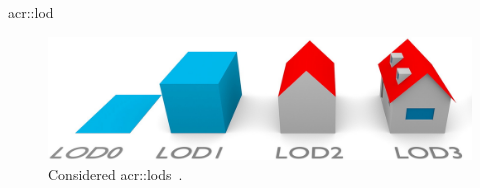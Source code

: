 \documentclass[12pt]{beamer}
\begin{document}
            \begin{frame}{\texorpdfstring{\acrfull*{acr::lod}}{Level of Detail}}
                \begin{figure}[H]
                    \centering
                    \includegraphics[width=\textwidth]{images/introduction/lods_3}
                    \caption{Considered \glspl{acr::lod}~\parencite{biljecki2016improved}.}
                \end{figure}
            \end{frame}
\end{document}
